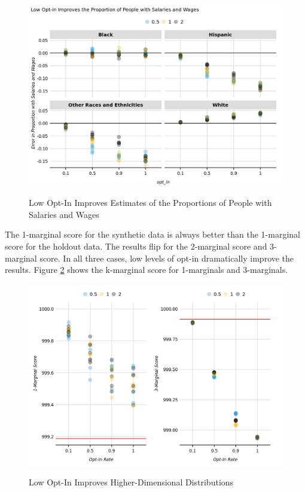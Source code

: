 \documentclass[
]{urban-formatting}
\begin{document}
\begin{figure}[!htb]
    \caption{Low Opt-In Improves Estimates of the Proportions of People with Salaries and Wages}
    \centering
    \includegraphics[width=6.5in]{../analysis/figures/proportion-with-wages-3.png}
    \label{fig:prop-wages}
\end{figure}

The 1-marginal score for the synthetic data is always better than the
1-marginal score for the holdout data. The results flip for the
2-marginal score and 3-marginal score. In all three cases, low levels of
opt-in dramatically improve the results. Figure \ref{fig:kmarginals}
shows the k-marginal score for 1-marginals and 3-marginals.

\begin{figure}[!htb]
    \caption{Low Opt-In Improves Higher-Dimensional Distributions}
    \centering
    \includegraphics[width=6.5in]{../analysis/figures/kmarginals-4.png}
    \label{fig:kmarginals}
\end{figure}
\end{document}
